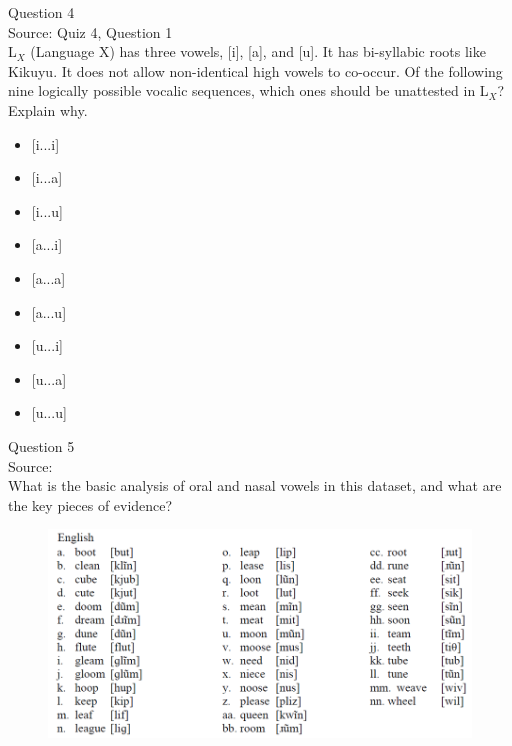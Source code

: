 \documentclass[12pt]{article}
\begin{document}
\newpage

{\large Question 4}\\

Source: Quiz 4, Question 1\\

L$_X$ (Language X) has three vowels, [i], [a], and [u]. It has bi-syllabic roots like Kikuyu. It does not allow non-identical high vowels to co-occur. Of the following nine logically possible vocalic sequences, which ones should be unattested in L$_X$? Explain why.\\

\begin{itemize} \item {[i...i]} \item {[i...a]} \item {[i...u]} \item {[a...i]} \item {[a...a]} \item {[a...u]} \item {[u...i]} \item {[u...a]} \item {[u...u]} \end{itemize}


\newpage

{\large Question 5}\\

Source: \\

What is the basic analysis of oral and nasal vowels in this dataset, and what are the key pieces of evidence?\\

\begin{figure}[H]
\includegraphics{../images/english12.png}
\end{figure}

\newpage

\begin{center}
\textbf{{\color{red}{\HUGE END OF EXAM}}}\\

\end{center}
\newpage
\end{document}
